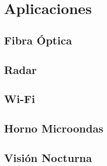 \chapter{Aplicaciones}%
\section{Fibra Óptica}

\section{Radar}

\section{Wi-Fi}

\section{Horno Microondas}

\section{Visión Nocturna}

